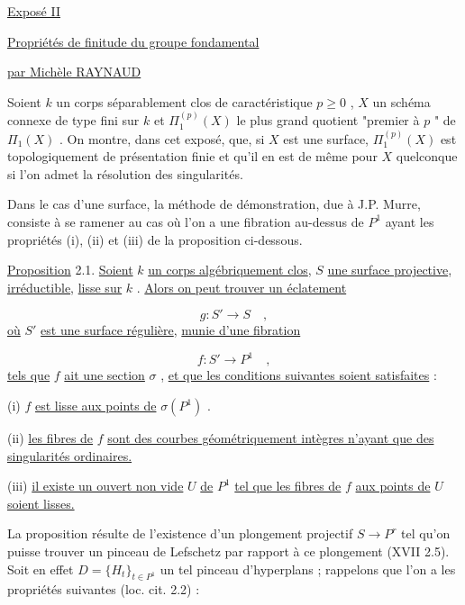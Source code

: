 


\underline{Exposé II}


\underline{\underline{Propriétés de finitude du groupe fondamental}}


\underline{par Michèle RAYNAUD}

Soient  $k$  un corps séparablement clos de caractéristique  $p \geqslant 0$ , $X$  un schéma connexe de type fini sur  $k$  et  $\Pi_1^{(p)}(X)$  le plus grand quotient "premier à $p$ " de  $\Pi_1(X)$ . On montre, dans cet exposé, que, si  $X$  est une surface, $\Pi_1^{(p)}(X)$  est topologiquement de présentation finie et qu'il en est de même pour  $X$  quelconque si l'on admet la résolution des singularités.

Dans le cas d'une surface, la méthode de démonstration, due à J.P. Murre, consiste à se ramener au cas où l'on a une fibration au-dessus de  $P^1$  ayant les propriétés (i), (ii) et (iii) de la proposition ci-dessous.

\underline{Proposition} 2.1.  \underline{Soient}  $k$  \underline{un corps algébriquement clos},  $S$  \underline{une surface projective}, \underline{irréductible}, \underline{lisse sur}  $k$ . \underline{Alors on peut trouver un éclatement}

\[ g : S' \longrightarrow S \quad , \]
\underline{où}  $S'$  \underline{est une surface régulière}, \underline{munie d'une fibration}

\[ f : S' \longrightarrow P^1 \quad , \]
\underline{tels que}  $f$  \underline{ait une section}  $\sigma$  , \underline{et que les conditions suivantes soient satisfaites} :

(i)   $f$  \underline{est lisse aux points de}  $\sigma(P^1)$ .

(ii)  \underline{les fibres de}  $f$  \underline{sont des courbes géométriquement intègres n'ayant que des singularités ordinaires.}

(iii) \underline{il existe un ouvert non vide}  $U$  \underline{de}  $P^1$  \underline{tel que les fibres de}  $f$  \underline{aux points de}  $U$  \underline{soient lisses.}

La proposition résulte de l'existence d'un plongement projectif  $S \longrightarrow P^r$  tel qu'on puisse trouver un pinceau de Lefschetz par rapport à ce plongement (XVII 2.5). Soit en effet  $D = \{H_t\}_{t \in P^1}$  un tel pinceau d'hyperplans ; rappelons que l'on
a les propriétés suivantes (loc. cit. 2.2) :

